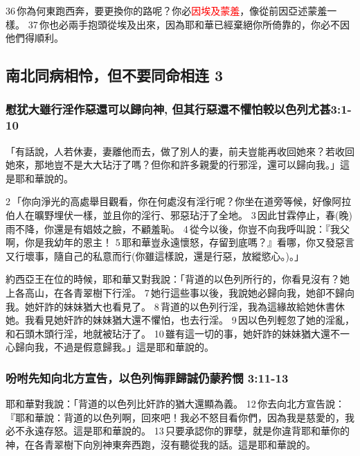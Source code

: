 36 你為何東跑西奔，要更換你的路呢？你必\textcolor{red}{因埃及蒙羞}，像從前因亞述蒙羞一樣。 37 你也必兩手抱頭從埃及出來，因為耶和華已經棄絕你所倚靠的，你必不因他們得順利。

\subsection{南北同病相怜，但不要同命相连 3}
\subsubsection{慰犹大雖行淫作惡還可以歸向神, 但其行惡還不懼怕較以色列尤甚3:1-10}
「有話說，人若休妻，妻離他而去，做了別人的妻，前夫豈能再收回她來？若收回她來，那地豈不是大大玷汙了嗎？但你和許多親愛的行邪淫，還可以歸向我。」這是耶和華說的。

2 「你向淨光的高處舉目觀看，你在何處沒有淫行呢？你坐在道旁等候，好像阿拉伯人在曠野埋伏一樣，並且你的淫行、邪惡玷汙了全地。 3 因此甘霖停止，春(晚)雨不降，你還是有娼妓之臉，不顧羞恥。 4 從今以後，你豈不向我呼叫說：『我父啊，你是我幼年的恩主！ 5 耶和華豈永遠懷怒，存留到底嗎？』看哪，你又發惡言又行壞事，隨自己的私意而行(你雖這樣說，還是行惡，放縱慾心。)。」

約西亞王在位的時候，耶和華又對我說：「背道的以色列所行的，你看見沒有？她上各高山，在各青翠樹下行淫。 7 她行這些事以後，我說她必歸向我，她卻不歸向我。她奸詐的妹妹猶大也看見了。 8 背道的以色列行淫，我為這緣故給她休書休她。我看見她奸詐的妹妹猶大還不懼怕，也去行淫。 9 因以色列輕忽了她的淫亂，和石頭木頭行淫，地就被玷汙了。 10 雖有這一切的事，她奸詐的妹妹猶大還不一心歸向我，不過是假意歸我。」這是耶和華說的。

\subsubsection{吩咐先知向北方宣告，以色列悔罪歸誠仍蒙矜憫 3:11-13}
耶和華對我說：「背道的以色列比奸詐的猶大還顯為義。 12 你去向北方宣告說：『耶和華說：背道的以色列啊，回來吧！我必不怒目看你們，因為我是慈愛的，我必不永遠存怒。這是耶和華說的。 13 只要承認你的罪孽，就是你違背耶和華你的神，在各青翠樹下向別神東奔西跑，沒有聽從我的話。這是耶和華說的。 


